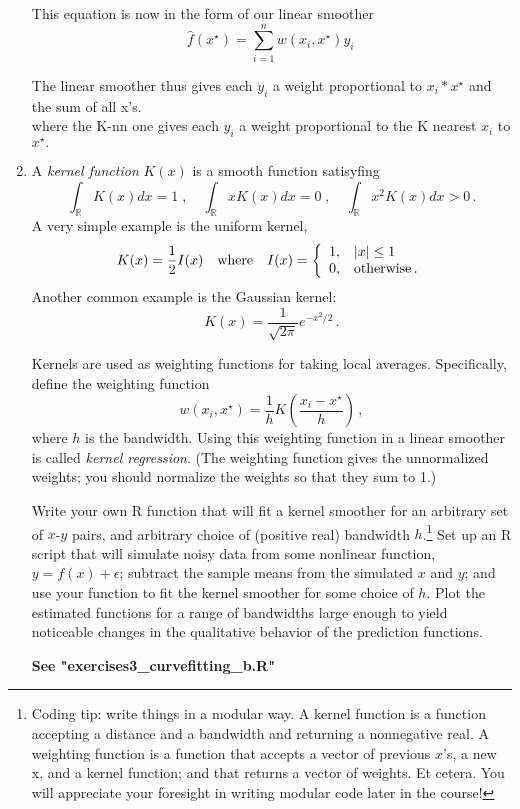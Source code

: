 \documentclass{homework}
\begin{document}
\begin{enumerate}[label=(\Alph*)]
\par This equation is now in the form of our linear smoother
$$ \hat{f}(x^{\star}) =  \sum_{i=1}^n w(x_i, x^{\star}) y_i   \, $$

\par The linear smoother thus gives each $y_i$ a weight proportional to $x_i * x^{\star}$ and the sum of all x's.\\
where the K-nn one gives each $y_i$ a weight proportional to the K nearest $x_i$ to $x^{\star}.$
\\
\item A \textit{kernel function} $K(x)$ is a smooth function satisyfing
$$
\int_\mathbb{R} K(x) dx = 1 \; , \quad \int_\mathbb{R} x K(x) dx = 0 \; , \quad \int_\mathbb{R} x^2 K(x) dx > 0 \, .
$$
A very simple example is the uniform kernel,
$$
K(x) = \frac{1}{2} I(x) \quad \mbox{where} \quad I(x) = 
\left\{
\begin{array}{l l}
1, & |x| \leq 1 \\
0, & \mbox{otherwise} \, . \\
\end{array}
\right.
$$
Another common example is the Gaussian kernel:
$$
K(x) = \frac{1}{\sqrt{2 \pi}} e^{-x^2/2} \, .
$$

Kernels are used as weighting functions for taking local averages.  Specifically, define the weighting function
$$
w(x_i, x^{\star}) = \frac{1}{h} K \left( \frac{x_i - x^{\star}}{h} \right)  \, ,
$$
where $h$ is the bandwidth.    Using this weighting function in a linear smoother is called \textit{kernel regression}.  (The weighting function gives the unnormalized weights; you should normalize the weights so that they sum to 1.)

Write your own R function that will fit a kernel smoother for an arbitrary set of $x$-$y$ pairs, and arbitrary choice of (positive real) bandwidth $h$.\footnote{Coding tip: write things in a modular way.  A kernel function is a function accepting a distance and a bandwidth and returning a nonnegative real.  A weighting function is a function that accepts a vector of previous $x$'s, a new x, and a kernel function; and that returns a vector of weights.  Et cetera.  You will appreciate your foresight in writing modular code later in the course!}  Set up an R script that will simulate noisy data from some nonlinear function, $y = f(x) + \epsilon$; subtract the sample means from the simulated $x$ and $y$; and use your function to fit the kernel smoother for some choice of $h$.  Plot the estimated functions for a range of bandwidths large enough to yield noticeable changes in the qualitative behavior of the prediction functions.

\textbf{See "exercises3\_curvefitting\_b.R"}

\end{enumerate}
\end{document}
